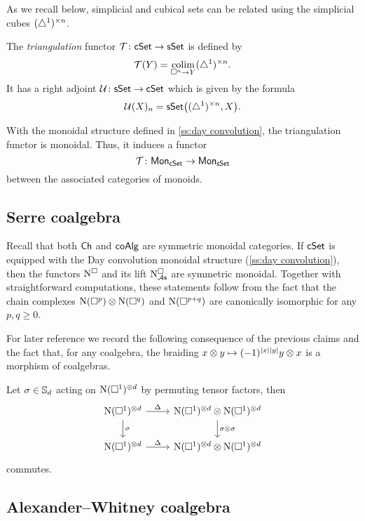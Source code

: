 As we recall below, simplicial and cubical sets can be related using the simplicial cubes $(\simplex^1)^{\times n}$.

The \textit{triangulation} functor $\mathcal{T} \colon \cSet \to \sSet$ is defined by
\[
\mathcal{T}(Y) = \colim_{\cube^n \to Y} (\simplex^1)^{\times n}.
\]
It has a right adjoint $\mathcal{U} \colon \sSet \to \cSet$ which is given by the formula
\[
\mathcal{U}(X)_n = \sSet \big( (\simplex^1)^{\times n}, X \big).
\]

With the monoidal structure defined in \cref{ss:day convolution}, the triangulation functor is monoidal.
Thus, it induces a functor
\[
\mathcal{T} \colon \Mon_{\cSet} \to \Mon_{\sSet}
\]
between the associated categories of monoids.

\subsection{Serre coalgebra} \label{ss:serre coalgebra sym monoidal}

Recall that both $\Ch$ and $\coAlg$ are symmetric monoidal categories.
If $\cSet$ is equipped with the Day convolution monoidal structure (\cref{ss:day convolution}), then the functors $\cchains$ and its lift $\cchainsAS$ are symmetric monoidal.
Together with straightforward computations, these statements follow from the fact that the chain complexes $\chains(\cube^p) \otimes \chains(\cube^q)$ and $\chains(\cube^{p+q})$ are canonically isomorphic for any $p, q \geq 0$.

For later reference we record the following consequence of the previous claims and the fact that, for any coalgebra, the braiding $x \otimes y \mapsto (-1)^{\bars{x} \bars{y}} y \otimes x$ is a morphism of coalgebras.

\begin{lemma} \label{l:serre diagonal invariant}
	Let $\sigma \in \S_d$ acting on $\chains(\cube^1)^{\otimes d}$ by permuting tensor factors, then
	\[
	\begin{tikzcd}
	\chains(\cube^1)^{\otimes d} \arrow[r, "\Delta"] \arrow[d, "\sigma"] &
	\chains(\cube^1)^{\otimes d} \otimes \chains(\cube^1)^{\otimes d} \arrow[d, "\sigma \otimes \sigma"] \\
	\chains(\cube^1)^{\otimes d} \arrow[r, "\Delta"] &
	\chains(\cube^1)^{\otimes d} \otimes \chains(\cube^1)^{\otimes d}
	\end{tikzcd}
	\]
	commutes.
\end{lemma}

\subsection{Alexander--Whitney coalgebra}

